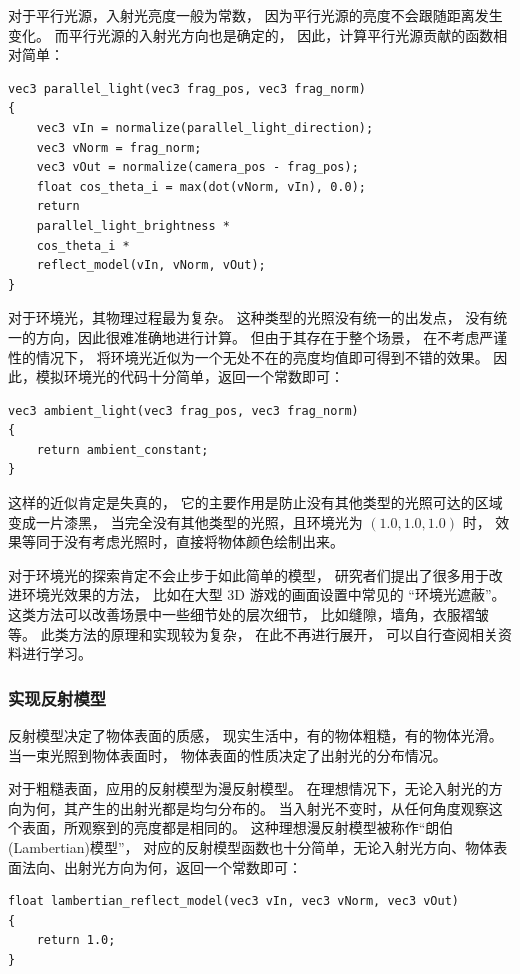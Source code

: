 \documentclass[fontset=windows]{ctexart}
\begin{document}
对于平行光源，入射光亮度一般为常数，
因为平行光源的亮度不会跟随距离发生变化。
而平行光源的入射光方向也是确定的，
因此，计算平行光源贡献的函数相对简单：
\begin{lstlisting}
vec3 parallel_light(vec3 frag_pos, vec3 frag_norm)
{
    vec3 vIn = normalize(parallel_light_direction);
    vec3 vNorm = frag_norm; 
    vec3 vOut = normalize(camera_pos - frag_pos);
    float cos_theta_i = max(dot(vNorm, vIn), 0.0);
    return 
    parallel_light_brightness * 
    cos_theta_i * 
    reflect_model(vIn, vNorm, vOut);
}
\end{lstlisting}

对于环境光，其物理过程最为复杂。
这种类型的光照没有统一的出发点，
没有统一的方向，因此很难准确地进行计算。
但由于其存在于整个场景，
在不考虑严谨性的情况下，
将环境光近似为一个无处不在的亮度均值即可得到不错的效果。
因此，模拟环境光的代码十分简单，返回一个常数即可：

\begin{lstlisting}
vec3 ambient_light(vec3 frag_pos, vec3 frag_norm)
{
    return ambient_constant;
}    
\end{lstlisting}

这样的近似肯定是失真的，
它的主要作用是防止没有其他类型的光照可达的区域变成一片漆黑，
当完全没有其他类型的光照，且环境光为 $(1.0, 1.0, 1.0)$ 时，
效果等同于没有考虑光照时，直接将物体颜色绘制出来。

对于环境光的探索肯定不会止步于如此简单的模型，
研究者们提出了很多用于改进环境光效果的方法，
比如在大型 3D 游戏的画面设置中常见的 “环境光遮蔽”。
这类方法可以改善场景中一些细节处的层次细节，
比如缝隙，墙角，衣服褶皱等。
此类方法的原理和实现较为复杂，
在此不再进行展开，
可以自行查阅相关资料进行学习。

\subsubsection{实现反射模型}

反射模型决定了物体表面的质感，
现实生活中，有的物体粗糙，有的物体光滑。
当一束光照到物体表面时，
物体表面的性质决定了出射光的分布情况。

对于粗糙表面，应用的反射模型为漫反射模型。
在理想情况下，无论入射光的方向为何，其产生的出射光都是均匀分布的。
当入射光不变时，从任何角度观察这个表面，所观察到的亮度都是相同的。
这种理想漫反射模型被称作“朗伯(Lambertian)模型”，
对应的反射模型函数也十分简单，无论入射光方向、物体表面法向、出射光方向为何，返回一个常数即可：

\begin{lstlisting}
float lambertian_reflect_model(vec3 vIn, vec3 vNorm, vec3 vOut)
{
    return 1.0;
}
\end{lstlisting}
\end{document}
